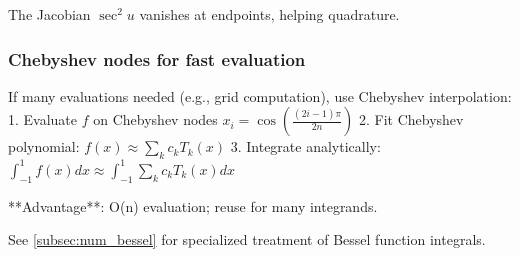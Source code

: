 The Jacobian $\sec^2 u$ vanishes at endpoints, helping quadrature.

\subsubsection{Chebyshev nodes for fast evaluation}

If many evaluations needed (e.g., grid computation), use Chebyshev interpolation:
1. Evaluate $f$ on Chebyshev nodes $x_i = \cos\left(\frac{(2i-1)\pi}{2n}\right)$
2. Fit Chebyshev polynomial: $f(x) \approx \sum_{k} c_k T_k(x)$
3. Integrate analytically: $\int_{-1}^1 f(x) dx \approx \int_{-1}^1 \sum_k c_k T_k(x) dx$

**Advantage**: O(n) evaluation; reuse for many integrands.

See \cref{subsec:num_bessel} for specialized treatment of Bessel function integrals.
